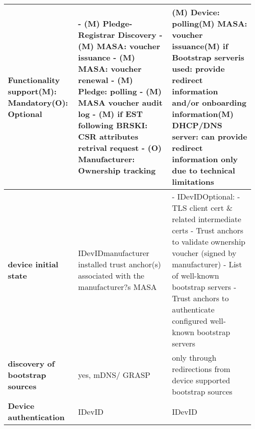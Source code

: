 \begin{landscape}
\begin{longtable}[!htbp]{|p{4cm}|l|l|}
		\rowcolor[rgb]{ .745,  .804,  .843} \textbf{Functionality support\newline{}(M): Mandatory\newline{}(O): Optional} & \multicolumn{1}{p{18.335em}|}{\cellcolor[rgb]{ 1,  1,  1} - (M) Pledge-Registrar Discovery\newline{} - (M) MASA: voucher issuance\newline{} - (M) MASA: voucher renewal\newline{} - (M) Pledge: polling\newline{} - (M) MASA voucher audit log\newline{} - (M) if EST following BRSKI: CSR attributes retrival request\newline{} - (O) Manufacturer: Ownership tracking} & \multicolumn{1}{p{18.335em}|}{\cellcolor[rgb]{ 1,  1,  1}(M) Device: polling\newline{}(M) MASA: voucher issuance\newline{}(M) if Bootstrap serveris used: provide redirect information and/or onboarding information\newline{}(M) DHCP/DNS server: can provide redirect information only due to technical limitations} \bigstrut\\
		\hline
		\rowcolor[rgb]{ .745,  .804,  .843} \textbf{device initial state} & \multicolumn{1}{p{18.335em}|}{\cellcolor[rgb]{ 1,  1,  1}IDevID\newline{}manufacturer installed trust anchor(s) associated with the manufacturer?s MASA} & \multicolumn{1}{p{18.335em}|}{\cellcolor[rgb]{ 1,  1,  1} - IDevID\newline{}Optional:\newline{} - TLS client cert \& related intermediate certs\newline{} - Trust anchors to validate ownership voucher (signed by manufacturer)\newline{} - List of well-known bootstrap servers\newline{} - Trust anchors to authenticate configured well-known bootstrap servers} \bigstrut\\
		\hline
		\rowcolor[rgb]{ .745,  .804,  .843} \textbf{discovery of bootstrap sources} & \cellcolor[rgb]{ 1,  1,  1}yes, mDNS/ GRASP & \multicolumn{1}{p{18.335em}|}{\cellcolor[rgb]{ 1,  1,  1}only through redirections from device supported bootstrap sources} \bigstrut\\
		\hline
		\rowcolor[rgb]{ .745,  .804,  .843} \textbf{Device authentication} & \cellcolor[rgb]{ 1,  1,  1}IDevID & \cellcolor[rgb]{ 1,  1,  1}IDevID \bigstrut\\

\end{longtable}
\end{landscape}
